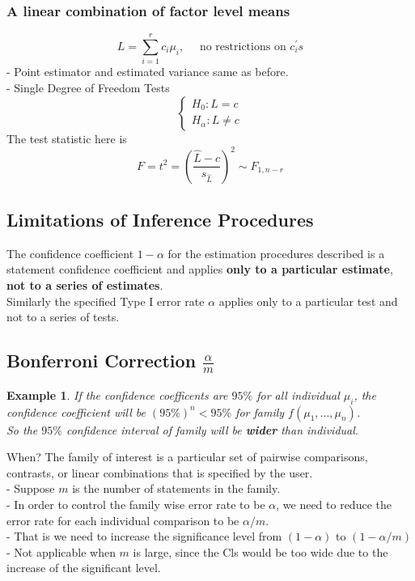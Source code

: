\documentclass[11pt,a4paper]{article}
\newtheorem{example}{Example}
\begin{document}
\subsubsection{A linear combination of factor level means}
$$
L=\sum_{i=1}^{r} c_{i} \mu_{i}, \quad \text { no restrictions on } c_{i}^{\prime} s
$$
- Point estimator and estimated variance same as before.\\
- Single Degree of Freedom Tests
$$
\left\{\begin{array}{l}
H_{0}: L=c \\
H_{\alpha}: L \neq c
\end{array}\right.
$$
The test statistic here is
$$
F=t^{2}=\left(\frac{\hat{L}-c}{s_{\hat{L}}}\right)^{2} \sim F_{1, n-r}
$$
\subsection{Limitations of Inference Procedures}
The conﬁdence coeﬃcient $1-\alpha$ for the estimation procedures described is a statement conﬁdence coeﬃcient and applies \textbf{only to a particular estimate}, \textbf{not to a series of estimates}.\\
Similarly the speciﬁed Type I error rate $\alpha$ applies only to a particular test and not to a series of tests.

\subsection{Bonferroni Correction $\frac{\alpha}{m}$}
\begin{example}
If the confidence coefficents are $95\%$ for all individual $\mu_i$, the confidence coefficient will be $(95\%)^n<95\%$ for family $f(\mu_1,...,\mu_n)$.\\
So the $95\%$ confidence interval of family will be \textbf{wider} than individual.
\end{example}


When? The family of interest is a particular set of pairwise comparisons, contrasts, or linear combinations that is specified by the user.\\
- Suppose $m$ is the number of statements in the family.\\
- In order to control the family wise error rate to be $\alpha$, we need to reduce the error rate for each individual comparison to be $\alpha / m$.\\
- That is we need to increase the significance level from $(1-\alpha)$ to $(1-\alpha / m)$\\
- Not applicable when $m$ is large, since the Cls would be too wide due to the increase of the significant level.
\end{document}

